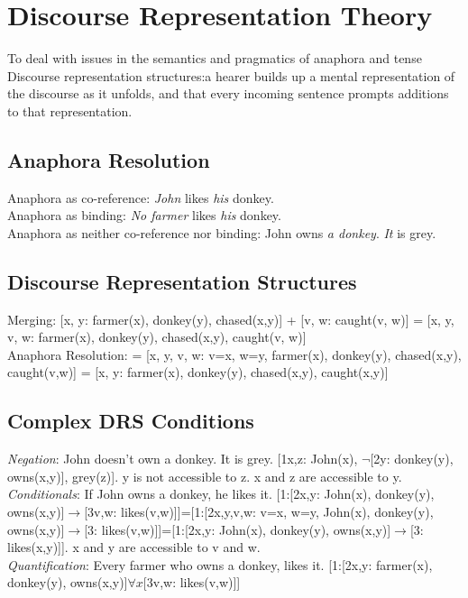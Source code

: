 \section{Discourse Representation Theory}
To deal with issues in the semantics and pragmatics of anaphora and tense\\
Discourse representation structures:a hearer builds up a mental representation of the discourse as it unfolds, and that every incoming sentence prompts additions to that representation. 
\subsection*{Anaphora Resolution}
Anaphora as co-reference: \emph{John} likes \emph{his} donkey.\\
Anaphora as binding: \emph{No farmer} likes \emph{his} donkey.\\
Anaphora as neither co-reference nor binding: John owns \emph{a donkey}. \emph{It} is grey.\\
\subsection*{Discourse Representation Structures}
Merging: [x, y: farmer(x), donkey(y), chased(x,y)] + [v, w: caught(v, w)] = [x, y, v, w: farmer(x), donkey(y), chased(x,y), caught(v, w)]\\
Anaphora Resolution: = [x, y, v, w: v=x, w=y, farmer(x), donkey(y), chased(x,y), caught(v,w)] = [x, y: farmer(x), donkey(y), chased(x,y), caught(x,y)]
\subsection*{Complex DRS Conditions}
\emph{Negation}: John doesn't own a donkey. It is grey. [1x,z: John(x), $\neg$[2y: donkey(y), owns(x,y)], grey(z)]. y is not accessible to z. x and z are accessible to y.\\
\emph{Conditionals}: If John owns a donkey, he likes it. [1:[2x,y: John(x), donkey(y), owns(x,y)]$\to$[3v,w: likes(v,w)]]=[1:[2x,y,v,w: v=x, w=y, John(x), donkey(y), owns(x,y)]$\to$[3: likes(v,w)]]=[1:[2x,y: John(x), donkey(y), owns(x,y)]$\to$[3: likes(x,y)]]. x and y are accessible to v and w.\\
\emph{Quantification}: Every farmer who owns a donkey, likes it. [1:[2x,y: farmer(x), donkey(y), owns(x,y)]$\forall x$[3v,w: likes(v,w)]]